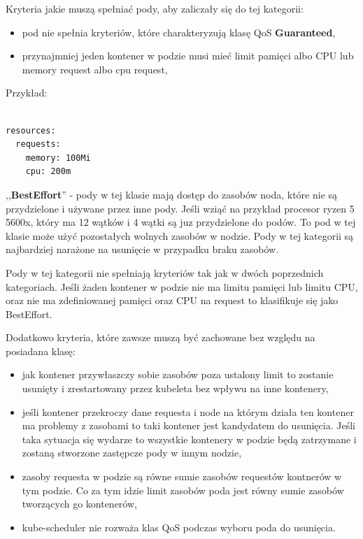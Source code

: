 \documentclass{iiuwb}
\begin{document}
Kryteria jakie muszą spełniać pody, aby zaliczały się do tej 
kategorii:

\begin{itemize}
 \item pod nie spełnia kryteriów, które charakteryzują klasę
 QoS \textbf{Guaranteed},
 \item przynajmniej jeden kontener w podzie musi mieć limit 
 pamięci albo CPU lub memory request albo cpu request,
\end{itemize}

Przykład: 

\begin{lstlisting}[breaklines=true]

resources:
  requests:
    memory: 100Mi
    cpu: 200m

\end{lstlisting}

,,\textbf{BestEffort}'' - pody w tej klasie mają dostęp do 
zasobów noda, które nie są przydzielone i używane przez inne 
pody. Jeśli wziąć na przykład procesor ryzen 5 5600x, który ma 
12 wątków i 4 wątki są juz przydzielone do podów. To pod w tej 
klasie może użyć pozostałych wolnych zasobów w nodzie. Pody 
w tej kategorii są najbardziej narażone na usunięcie w przypadku 
braku zasobów.

Pody w tej kategorii nie spełniają kryteriów tak jak 
w dwóch poprzednich kategoriach. Jeśli żaden kontener w podzie 
nie ma limitu pamięci lub limitu CPU, oraz nie ma zdefiniowanej 
pamięci oraz CPU na request to klasifikuje się jako BestEffort.

Dodatkowo kryteria, które zawsze muszą być zachowane bez 
względu na posiadana klasę: 

\begin{itemize}
  \item jak kontener przywłaszczy sobie zasobów poza ustalony 
  limit to zostanie usunięty i zrestartowany przez kubeleta bez 
  wpływu na inne kontenery,
  \item jeśli kontener przekroczy dane requesta i node na którym 
  działa ten kontener ma problemy z zasobami to taki kontener 
  jest kandydatem do usunięcia. Jeśli taka sytuacja się wydarze to 
  wszystkie kontenery w podzie będą zatrzymane i zostaną stworzone 
  zastępcze pody w innym nodzie,
  \item  zasoby requesta w podzie są równe sumie zasobów 
  requestów kontnerów w tym podzie. Co za tym idzie limit zasobów poda 
  jest równy sumie zasobów tworzących go kontenerów,
  \item kube-scheduler nie rozważa klas QoS podczas wyboru poda 
  do usunięcia.
\end{itemize}
 
\end{document}
